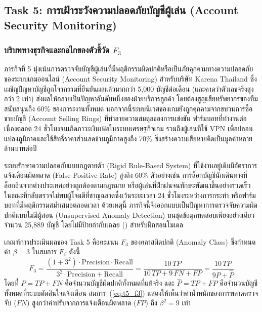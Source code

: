 \clearpage
\subsection{Task 5: การเฝ้าระวังความปลอดภัยบัญชีผู้เล่น (Account Security Monitoring)}
\label{subsec:task5}

\subsubsection{บริบททางธุรกิจและกลไกของตัวชี้วัด \texorpdfstring{$F_3$}{F3}}
\label{subsubsec:t5_business_f3}

ภารกิจที่ 5 มุ่งเน้นการตรวจจับบัญชีผู้เล่นที่มีพฤติกรรมผิดปกติหรือเป็นภัยคุกคามทางความปลอดภัยของระบบเกมออนไลน์ (Account Security Monitoring) สำหรับบริษัท Karena Thailand ซึ่งเผชิญปัญหาบัญชีถูกโจรกรรมที่ยืนยันผลแล้วมากกว่า 5,000 บัญชีต่อเดือน (และคาดว่าตัวเลขจริงสูงกว่า 2 เท่า) ส่งผลให้กลายเป็นปัญหาอันดับหนึ่งของฝ่ายบริการลูกค้า โดยต้องสูญเสียทรัพยากรของทีมสนับสนุนถึง 60\% ของภาระงานทั้งหมด นอกจากนี้ระบบนิเวศของเกมยังถูกคุกคามจากขบวนการซื้อขายบัญชี (Account Selling Rings) ที่ทำลายความสมดุลของการแข่งขัน ฟาร์มบอทที่ทำงานต่อเนื่องตลอด 24 ชั่วโมงจนเกิดภาวะเงินเฟ้อในระบบเศรษฐกิจเกม รวมถึงผู้เล่นที่ใช้ VPN เพื่อปลอมแปลงภูมิภาคและใช้สิทธิ์ราคาส่วนลดข้ามภูมิภาคสูงถึง 70\% ซึ่งสร้างความเสียหายคิดเป็นมูลค่าหลายล้านบาทต่อปี

ระบบรักษาความปลอดภัยแบบกฎตายตัว (Rigid Rule-Based System) ที่ใช้งานอยู่เดิมมีอัตราการแจ้งเตือนผิดพลาด (False Positive Rate) สูงถึง 60\% ตัวอย่างเช่น การล็อกบัญชีนักเดินทางที่ล็อกอินจากต่างประเทศอย่างถูกต้องตามกฎหมาย หรือผู้เล่นที่ฝึกฝนจนทักษะพัฒนาขึ้นอย่างรวดเร็ว ในขณะที่กลับตรวจไม่พบผู้โจมตีที่ชาญฉลาดซึ่งเว้นระยะเวลา 24 ชั่วโมงระหว่างการกระทำ หรือฟาร์มบอทที่มีพฤติกรรมสม่ำเสมอตลอดเวลา ด้วยเหตุนี้ ภารกิจนี้จึงออกแบบเป็นปัญหาการตรวจจับความผิดปกติแบบไม่มีผู้สอน (Unsupervised Anomaly Detection) บนชุดข้อมูลทดสอบเพียงอย่างเดียวจำนวน 25,889 บัญชี โดยไม่มีป้ายกำกับเฉลย () สำหรับฝึกสอนโมเดล

เกณฑ์การประเมินผลของ Task 5 คือคะแนน $F_3$ ของคลาสผิดปกติ (Anomaly Class) ซึ่งกำหนดค่า $\beta = 3$ ในสมการ $F_\beta$ ดังนี้
\begin{equation}
F_3 = \frac{(1 + 3^2) \cdot \text{Precision} \cdot \text{Recall}}{3^2 \cdot \text{Precision} + \text{Recall}} = \frac{10\,TP}{10\,TP + 9\,FN + FP} = \frac{10\,TP}{9P + \hat{P}}
\label{eq:t5_f3}
\end{equation}
โดยที่ $P = TP + FN$ คือจำนวนบัญชีผิดปกติทั้งหมดที่แท้จริง และ $\hat{P} = TP + FP$ คือจำนวนบัญชีทั้งหมดที่ระบบตัดสินใจแจ้งเตือน สมการ~(\ref{eq:t5_f3}) แสดงให้เห็นว่าค่าน้ำหนักของการพลาดตรวจจับ ($FN$) สูงกว่าค่าปรับจากการแจ้งเตือนผิดพลาด ($FP$) ถึง $\beta^2 = 9$ เท่า


